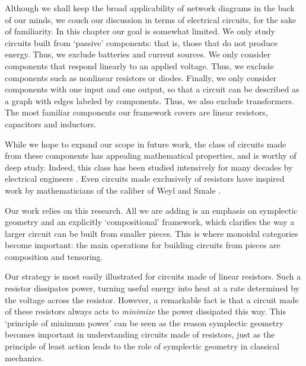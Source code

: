 Although we shall keep the broad applicability of network diagrams in the back
of our minds, we couch our discussion in terms of electrical circuits, for the
sake of familiarity. In this chapter our goal is somewhat limited.  We only study circuits built from `passive' components: that is, those that do not produce energy.  Thus, we exclude batteries and current sources.  We only consider components that respond linearly to an applied voltage.   Thus, we exclude components such as nonlinear resistors or diodes.  Finally, we only consider components with one input and one output, so that a circuit can be described as a graph with edges labeled by components.  Thus, we also exclude transformers.  The most familiar components our framework covers are linear resistors, capacitors and inductors.

While we hope to expand our scope in future work, the class of circuits made from these components has appealing mathematical properties, and is worthy of deep study.  Indeed, this class has been studied intensively for many decades by electrical engineers \cite{AV,Budak,Slepian}.  Even circuits made exclusively of resistors have inspired work by mathematicians of the caliber of Weyl \cite{Weyl} and Smale \cite{Smale}.  

Our work relies on this research.  All we are adding is an emphasis on symplectic geometry and an explicitly `compositional' framework, which clarifies the way a larger circuit can be built from smaller pieces.  This is where monoidal categories become important: the main operations for building circuits from pieces are composition and tensoring.
 
Our strategy is most easily illustrated for circuits made of linear resistors.  Such a resistor dissipates power, turning useful energy into heat at a rate determined by the voltage across the resistor.  However, a remarkable fact is that a circuit made of these resistors always acts to \emph{minimize} the power dissipated this way.  This `principle of minimum power' can be seen as the reason symplectic geometry becomes important in understanding circuits made of resistors, just as the principle of least action leads to the role of symplectic geometry in classical mechanics.  

